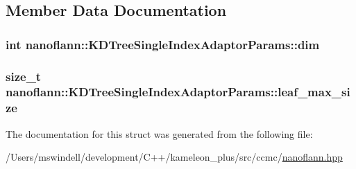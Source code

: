 \subsection{Member Data Documentation}
\hypertarget{structnanoflann_1_1_k_d_tree_single_index_adaptor_params_a3fa490f233559594e34b3c1fcb8e5057}{
\subsubsection[{dim}]{\setlength{\rightskip}{0pt plus 5cm}int nanoflann\-::\-K\-D\-Tree\-Single\-Index\-Adaptor\-Params\-::dim}}\label{structnanoflann_1_1_k_d_tree_single_index_adaptor_params_a3fa490f233559594e34b3c1fcb8e5057}
\hypertarget{structnanoflann_1_1_k_d_tree_single_index_adaptor_params_aa355e5ec6b36fbf75a77aef8b5287fca}{
\subsubsection[{leaf\-\_\-max\-\_\-size}]{\setlength{\rightskip}{0pt plus 5cm}size\-\_\-t nanoflann\-::\-K\-D\-Tree\-Single\-Index\-Adaptor\-Params\-::leaf\-\_\-max\-\_\-size}}\label{structnanoflann_1_1_k_d_tree_single_index_adaptor_params_aa355e5ec6b36fbf75a77aef8b5287fca}


The documentation for this struct was generated from the following file\-:\begin{DoxyCompactItemize}
\item 
/\-Users/mswindell/development/\-C++/kameleon\-\_\-plus/src/ccmc/\hyperlink{nanoflann_8hpp}{nanoflann.\-hpp}\end{DoxyCompactItemize}
